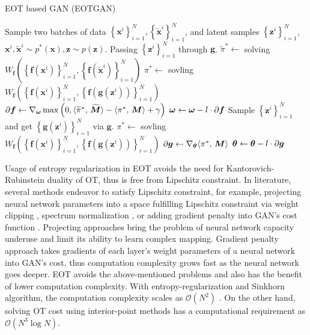 \begin{algorithm}[!t]
  \caption{EOT based GAN (EOTGAN)}\label{algo-eWGAN}
  \begin{algorithmic}[1]
    \STATE Sample two batches of data $ \left\{ \bm{x}^{i}
    \right\}_{i=1}^{N}, \left\{ \tilde{\bm{x}}^{i} \right\}_{i=1}^{N}  $,
    and latent samples $\left\{ \bm{z}^{i} \right\}_{i=1}^{N} $,
    $\bm{x}^{i},\tilde{\bm{x}}^{i} \sim p^{\ast}(\bm{x}), \bm{z}\sim p(\bm{z})$.
    \STATE Passing
    $\left\{ \bm{z}^{i} \right\}_{i=1}^{N}$ through $\bm{g}$.
    \STATE $\widetilde{\pi}^{\ast} \gets$ solving $ W_{\bm{f}}\left( \left\{ \bm{f}(\bm{x}^{i})
      \right\}_{i=1}^{N} , \left\{ \bm{f}(\tilde{\bm{x}}^{i})
      \right\}_{i=1}^{N}\right)$
    \STATE ${\pi}^{\ast} \gets$ sovling $W_{\bm{f}}\left( \left\{ \bm{f}(\bm{x}^{i})
      \right\}_{i=1}^{N}, \left\{ \bm{f}(\bm{g}(\bm{z}^i))
      \right\}_{i=1}^{N} \right)$
    \STATE $\partial{\bm{f}} \gets \nabla_{\bm{\omega}} \max\left(0,  \langle \widetilde{\pi}^{\ast},\,\widetilde{\bm{M}}\rangle-\langle {\pi^{\ast}},\,\bm{M}\rangle+ \gamma\right)$
    \STATE $\bm{\omega} \gets \bm{\omega} - l \cdot \partial{\bm{f}}$
    \STATE Sample $\left\{ \bm{z}^{i} \right\}_{i=1}^{N}$
    and get $ \left\{ \bm{g}(\bm{z}^i)\right\}_{i=1}^{N}$ via $\bm{g}$.
    \STATE $\pi^{\ast} \gets$ sovling $W_{\bm{f}}\left( \left\{ \bm{f}(\bm{x}^{i})
      \right\}_{i=1}^{N}, \left\{ \bm{f}(\bm{g}(\bm{z}^{i}))
      \right\}_{i=1}^{N} \right)$
    \STATE $\partial{\bm{g}} \gets \nabla_{\bm{\theta}} \langle \pi^{\ast},\,\bm{M}\rangle$
    \STATE $\bm{\theta} \gets \bm{\theta} -l \cdot \partial{\bm{g}}$
    \ENDWHILE
  \end{algorithmic}
\end{algorithm}

\begin{remark}

Usage of entropy regularization in EOT avoids the need for Kantorovich-Rubinstein duality
of OT, thus is free from Lipschitz constraint. In literature, several methods endeavor to
satisfy Lipschitz constraint, for example, projecting neural network
parameters into a space fulfilling Lipschitz constraint via weight
clipping \cite{2017arXiv170107875A}, spectrum
normalization \cite{2018arXiv180205957M}, or adding gradient 
penalty into GAN's cost function \cite{2017arXiv170400028G}. Projecting
approaches bring the problem of neural network capacity underuse and
limit its ability to learn complex mapping. Gradient penalty approach takes
gradients of each layer's weight parameters of a neural network into
GAN's cost, thus computation complexity grows fast as the neural
network goes deeper. 
EOT avoids the above-mentioned problems and also has the benefit of lower
computation complexity. With entropy-regularization and Sinkhorn
algorithm, the computation complexity scales as $\mathcal{O}(N^2)$ \cite{2013arXiv1306.0895C}. 
On the other hand, solving OT cost using interior-point methods has a computational requirement as 
$\mathcal{O}(N^3\log{N})$. 

\end{remark}

